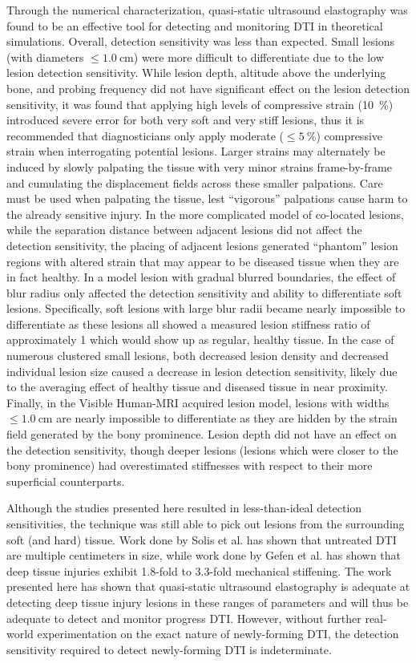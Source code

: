 		Through the numerical characterization, quasi-static ultrasound elastography was found to be an effective tool for detecting and monitoring DTI in theoretical simulations. Overall, detection sensitivity was less than expected. Small lesions (with diameters $\leq \SI{1.0}{\cm}$) were more difficult to differentiate due to the low lesion detection sensitivity. While lesion depth, altitude above the underlying bone, and probing frequency did not have significant effect on the lesion detection sensitivity, it was found that applying high levels of compressive strain (\SI{10}{\percent}) introduced severe error for both very soft and very stiff lesions, thus it is recommended that diagnosticians only apply moderate ($\leq \SI{5}{\percent}$) compressive strain when interrogating potential lesions. Larger strains may alternately be induced by slowly palpating the tissue with very minor strains frame-by-frame and cumulating the displacement fields across these smaller palpations. Care must be used when palpating the tissue, lest ``vigorous'' palpations cause harm to the already sensitive injury. In the more complicated model of co-located lesions, while the separation distance between adjacent lesions did not affect the detection sensitivity, the placing of adjacent lesions generated ``phantom'' lesion regions with altered strain that may appear to be diseased tissue when they are in fact healthy. In a model lesion with gradual blurred boundaries, the effect of blur radius only affected the detection sensitivity and ability to differentiate soft lesions. Specifically, soft lesions with large blur radii became nearly impossible to differentiate as these lesions all showed a measured lesion stiffness ratio of approximately 1 which would show up as regular, healthy tissue. In the case of numerous clustered small lesions, both decreased lesion density and decreased individual lesion size caused a decrease in lesion detection sensitivity, likely due to the averaging effect of healthy tissue and diseased tissue in near proximity. Finally, in the Visible Human-MRI acquired lesion model, lesions with widths $\leq \SI{1.0}{\cm}$ are nearly impossible to differentiate as they are hidden by the strain field generated by the bony prominence. Lesion depth did not have an effect on the detection sensitivity, though deeper lesions (lesions which were closer to the bony prominence) had overestimated stiffnesses with respect to their more superficial counterparts.

		Although the studies presented here resulted in less-than-ideal detection sensitivities, the technique was still able to pick out lesions from the surrounding soft (and hard) tissue. Work done by Solis et al. \cite{solis13} has shown that untreated DTI are multiple centimeters in size, while work done by Gefen et al. \cite{gefen05} has shown that deep tissue injuries exhibit 1.8-fold to 3.3-fold mechanical stiffening. The work presented here has shown that quasi-static ultrasound elastography is adequate at detecting deep tissue injury lesions in these ranges of parameters and will thus be adequate to detect and monitor progress DTI. However, without further real-world experimentation on the exact nature of newly-forming DTI, the detection sensitivity required to detect newly-forming DTI is indeterminate.

